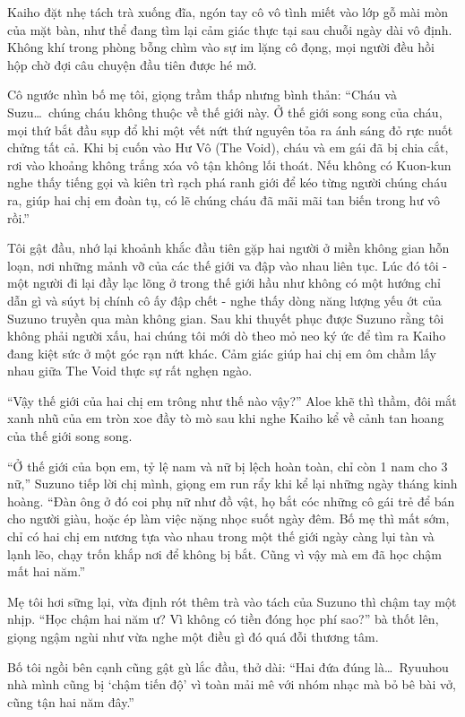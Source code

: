 ﻿\documentclass[../main.tex]{subfiles}
\begin{document}
Kaiho đặt nhẹ tách trà xuống đĩa, ngón tay cô vô tình miết vào lớp gỗ mài mòn của mặt bàn, như thể đang tìm lại cảm giác thực tại sau chuỗi ngày dài vô định. Không khí trong phòng bỗng chìm vào sự im lặng cô đọng, mọi người đều hồi hộp chờ đợi câu chuyện đầu tiên được hé mở.

Cô ngước nhìn bố mẹ tôi, giọng trầm thấp nhưng bình thản: ``Cháu và Suzu\dots\ chúng cháu không thuộc về thế giới này. Ở thế giới song song của cháu, mọi thứ bắt đầu sụp đổ khi một vết nứt thứ nguyên tỏa ra ánh sáng đỏ rực nuốt chửng tất cả. Khi bị cuốn vào Hư Vô (The Void), cháu và em gái đã bị chia cắt, rơi vào khoảng không trắng xóa vô tận không lối thoát. Nếu không có Kuon-kun nghe thấy tiếng gọi và kiên trì rạch phá ranh giới để kéo từng người chúng cháu ra, giúp hai chị em đoàn tụ, có lẽ chúng cháu đã mãi mãi tan biến trong hư vô rồi.''

Tôi gật đầu, nhớ lại khoảnh khắc đầu tiên gặp hai người ở miền không gian hỗn loạn, nơi những mảnh vỡ của các thế giới va đập vào nhau liên tục. Lúc đó tôi - một người đi lại đầy lạc lõng ở trong thế giới hầu như không có một hướng chỉ dẫn gì và súyt bị chính cô ấy đập chết - nghe thấy dòng năng lượng yếu ớt của Suzuno truyền qua màn không gian. Sau khi thuyết phục được Suzuno rằng tôi không phải người xấu, hai chúng tôi mới dò theo mỏ neo ký ức để tìm ra Kaiho đang kiệt sức ở một góc rạn nứt khác. Cảm giác giúp hai chị em ôm chầm lấy nhau giữa The Void thực sự rất nghẹn ngào.

``Vậy thế giới của hai chị em trông như thế nào vậy?'' Aloe khẽ thì thầm, đôi mắt xanh nhũ của em tròn xoe đầy tò mò sau khi nghe Kaiho kể về cảnh tan hoang của thế giới song song.

``Ở thế giới của bọn em, tỷ lệ nam và nữ bị lệch hoàn toàn, chỉ còn 1 nam cho 3 nữ,'' Suzuno tiếp lời chị mình, giọng em run rẩy khi kể lại những ngày tháng kinh hoàng. ``Đàn ông ở đó coi phụ nữ như đồ vật, họ bắt cóc những cô gái trẻ để bán cho người giàu, hoặc ép làm việc nặng nhọc suốt ngày đêm. Bố mẹ thì mất sớm, chỉ có hai chị em nương tựa vào nhau trong một thế giới ngày càng lụi tàn và lạnh lẽo, chạy trốn khắp nơi để không bị bắt. Cũng vì vậy mà em đã học chậm mất hai năm.''

Mẹ tôi hơi sững lại, vừa định rót thêm trà vào tách của Suzuno thì chậm tay một nhịp. ``Học chậm hai năm ư? Vì không có tiền đóng học phí sao?'' bà thốt lên, giọng ngậm ngùi như vừa nghe một điều gì đó quá đỗi thương tâm.

Bố tôi ngồi bên cạnh cũng gật gù lắc đầu, thở dài: ``Hai đứa đúng là\dots\ Ryuuhou nhà mình cũng bị `chậm tiến độ' vì toàn mải mê với nhóm nhạc mà bỏ bê bài vở, cũng tận hai năm đây.''
\end{document}
